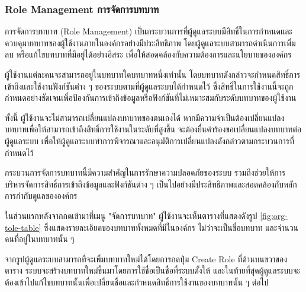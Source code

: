 \subsubsection{\ifenglish Role Management \else การจัดการบทบาท \fi}
\ifenglish \else
การจัดการบทบาท (Role Management) เป็นกระบวนการที่ผู้ดูแลระบบมีสิทธิ์ในการกำหนดและควบคุมบทบาทของผู้ใช้งานภายในองค์กรอย่างมีประสิทธิภาพ โดยผู้ดูแลระบบสามารถดำเนินการเพิ่ม ลบ หรือแก้ไขบทบาทที่มีอยู่ได้อย่างอิสระ เพื่อให้สอดคล้องกับความต้องการและนโยบายขององค์กร

ผู้ใช้งานแต่ละคนจะสามารถอยู่ในบทบาทใดบทบาทหนึ่งเท่านั้น โดยบทบาทดังกล่าวจะกำหนดสิทธิ์การเข้าถึงและใช้งานฟังก์ชันต่าง ๆ ของระบบตามที่ผู้ดูแลระบบได้กำหนดไว้ ซึ่งสิทธิ์ในการใช้งานนี้จะถูกกำหนดอย่างชัดเจนเพื่อป้องกันการเข้าถึงข้อมูลหรือฟังก์ชันที่ไม่เหมาะสมกับระดับบทบาทของผู้ใช้งาน

ทั้งนี้ ผู้ใช้งานจะไม่สามารถเปลี่ยนแปลงบทบาทของตนเองได้ หากมีความจำเป็นต้องเปลี่ยนแปลงบทบาทเพื่อให้สามารถเข้าถึงสิทธิ์การใช้งานในระดับที่สูงขึ้น จะต้องยื่นคำร้องขอเปลี่ยนแปลงบทบาทต่อผู้ดูแลระบบ เพื่อให้ผู้ดูแลระบบทำการพิจารณาและอนุมัติการเปลี่ยนแปลงดังกล่าวตามกระบวนการที่กำหนดไว้

กระบวนการจัดการบทบาทนี้มีความสำคัญในการรักษาความปลอดภัยของระบบ รวมถึงช่วยให้การบริหารจัดการสิทธิ์การเข้าถึงข้อมูลและฟังก์ชันต่าง ๆ เป็นไปอย่างมีประสิทธิภาพและสอดคล้องกับหลักการกำกับดูแลขององค์กร

ในส่วนแรกหลังจากกดเข้ามาที่เมนู "จัดการบทบาท" ผู้ใช้งานจะเห็นตารางที่แสดงดังรูป \ref{fig:org-tole-table} ซึ่งแสดงรายละเอียดของบทบาททั้งหมดที่มีในองค์กร ไม่ว่าจะเป็นชื่อบทบาท และจำนวนคนที่อยู่ในบทบาทนั้น ๆ

จากรูปผู้ดูแลระบบสามารถที่จะเพิ่มบทบาทใหม่ได้โดยการกดปุ่ม Create Role ที่ด้านบนขวาของตาราง ระบบจะสร้างบทบาทใหม่ขึ้นมาโดยการใช้ชื่อเป็นชื่อที่ระบบตั้งให้  และในท้ายที่สุดผู้ดูแลระบบจะต้องเข้าไปแก้ไขบทบาทนั้นเพื่อเปลี่ยนชื่อและกำหนดสิทธิ์การใช้งานของบทบาทนั้น ๆ ต่อไป
\fi


\clearpage

